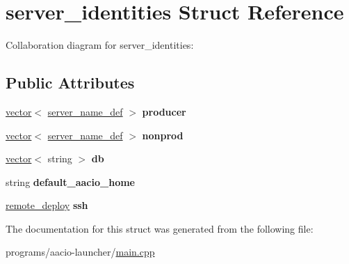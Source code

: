 \hypertarget{structserver__identities}{}\section{server\+\_\+identities Struct Reference}
\label{structserver__identities}


Collaboration diagram for server\+\_\+identities\+:
\subsection*{Public Attributes}
\begin{DoxyCompactItemize}
\item 
\mbox{\label{structserver__identities_a3392de338fa47364321e13607f82d67e}} 
\mbox{\hyperlink{classstd_1_1vector}{vector}}$<$ \mbox{\hyperlink{structserver__name__def}{server\+\_\+name\+\_\+def}} $>$ {\bfseries producer}
\item 
\mbox{\label{structserver__identities_ad50e255033e54f305466a3e2a1df6061}} 
\mbox{\hyperlink{classstd_1_1vector}{vector}}$<$ \mbox{\hyperlink{structserver__name__def}{server\+\_\+name\+\_\+def}} $>$ {\bfseries nonprod}
\item 
\mbox{\label{structserver__identities_afe3d4443ea83f6bea9358ce5ab9d606f}} 
\mbox{\hyperlink{classstd_1_1vector}{vector}}$<$ string $>$ {\bfseries db}
\item 
\mbox{\label{structserver__identities_aa547a7f133f7d1bbc06bac43cde8cde8}} 
string {\bfseries default\+\_\+aacio\+\_\+home}
\item 
\mbox{\label{structserver__identities_ad673da1ee0673399690593eba272cdc8}} 
\mbox{\hyperlink{structremote__deploy}{remote\+\_\+deploy}} {\bfseries ssh}
\end{DoxyCompactItemize}


The documentation for this struct was generated from the following file\+:\begin{DoxyCompactItemize}
\item 
programs/aacio-\/launcher/\mbox{\hyperlink{programs_2aacio-launcher_2main_8cpp}{main.\+cpp}}\end{DoxyCompactItemize}
